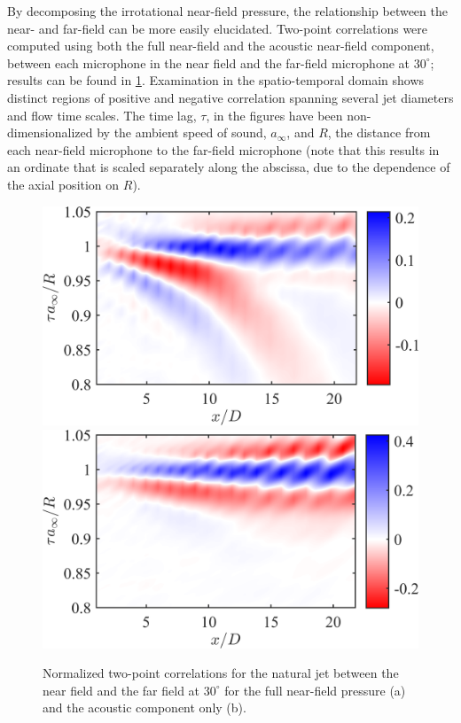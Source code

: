 By decomposing the irrotational near-field pressure, the relationship between the near- and far-field can be more easily elucidated. 
Two-point correlations were computed using both the full near-field and the acoustic near-field component, between each microphone in the near field and the far-field microphone at $30^\circ$; results can be found in \ref{fig:ch3_full_vs_partial_xcorr}. 
Examination in the spatio-temporal domain shows distinct regions of positive and negative correlation spanning several jet diameters and flow time scales.
The time lag, $\tau$, in the figures have been non-dimensionalized by the ambient speed of sound, $a_\infty$, and $R$, the distance from each near-field microphone to the far-field microphone (note that this results in an ordinate that is scaled separately along the abscissa, due to the dependence of the axial position on $R$).
\begin{figure}
	\centering
		\includegraphics[width=0.45\linewidth]{Figures/ch3_St000_xcorr_r1D.png}
		\includegraphics[width=0.45\linewidth]{Figures/ch3_St000_xcorr_acoustic.png}
	\caption{Normalized two-point correlations for the natural jet between the near field and the far field at $30^\circ$ for the full near-field pressure (a) and the acoustic component only (b).}
	\label{fig:ch3_full_vs_partial_xcorr}
\end{figure}

